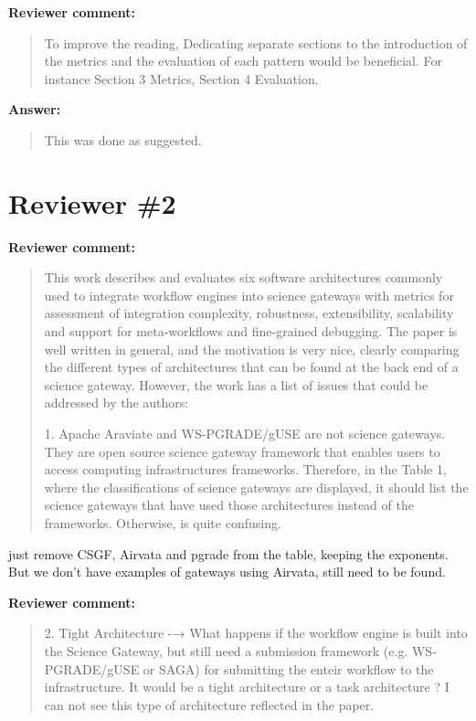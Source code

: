 \documentclass[a4]{article}
\newenvironment{review}%
{\textbf{Reviewer comment:}\begin{quote}}%
{\end{quote}}%
\newenvironment{answer}%
{\textbf{Answer:}\begin{small}\begin{quote}}%
{\end{quote}\end{small}}%
\newcommand{\todo}[1]{\color{red}#1\color{black}}
\begin{document}
\begin{review}
To improve the reading, Dedicating separate sections to the introduction of the metrics and the evaluation of each pattern would be beneficial. For instance Section 3 Metrics, Section 4 Evaluation.
\end{review}

\begin{answer}
This was done as suggested.
\end{answer}

\section{Reviewer \#2}

\begin{review}
  This work describes and evaluates six software architectures
  commonly used to integrate workflow engines into science gateways
  with metrics for assessment of integration complexity, robustness,
  extensibility, scalability and support for meta-workflows and
  fine-grained debugging. The paper is well written in general, and
  the motivation is very nice, clearly comparing the different types
  of architectures that can be found at the back end of a science
  gateway. However, the work has a list of issues that could be
  addressed by the authors:

1. Apache Araviate and WS-PGRADE/gUSE are not science gateways. They
are open source science gateway framework that enables users to access
computing infrastructures frameworks. Therefore, in the Table 1, where
the classifications of science gateways are displayed, it should list
the science gateways that have used those architectures instead of the
frameworks. Otherwise, is quite confusing.
\end{review}

\todo{just remove CSGF, Airvata and pgrade from the table, keeping the
  exponents. But we don't have examples of gateways using Airvata,
  still need to be found.}

\begin{review}
  2. Tight Architecture -→ What happens if the workflow engine is
  built into the Science Gateway, but still need a submission
  framework (e.g. WS-PGRADE/gUSE or SAGA) for submitting the enteir
  workflow to the infrastructure.  It would be a tight architecture or
  a task architecture ? I can not see this type of architecture
  reflected in the paper.
\end{review}
\end{document}
